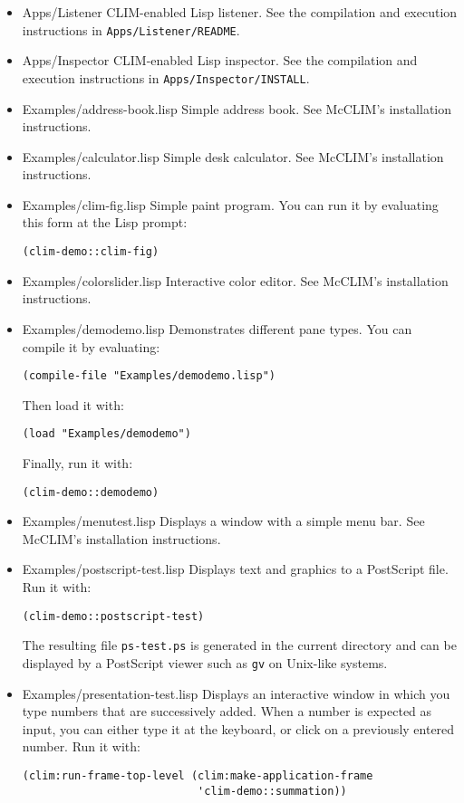 \begin{itemize}
\item Apps/Listener
CLIM-enabled Lisp listener.  See the compilation and execution
instructions in \texttt{Apps/Listener/README}.
\item Apps/Inspector
CLIM-enabled Lisp inspector.  See the compilation and execution
instructions in \texttt{Apps/Inspector/INSTALL}.
\item Examples/address-book.lisp
Simple address book.  See McCLIM's installation instructions.
\item Examples/calculator.lisp
Simple desk calculator.  See McCLIM's installation instructions.
\item Examples/clim-fig.lisp
Simple paint program.  You can run it by evaluating this form at the
Lisp prompt:
\begin{verbatim}
(clim-demo::clim-fig)
\end{verbatim}
\item Examples/colorslider.lisp
Interactive color editor.  See McCLIM's installation instructions.
\item Examples/demodemo.lisp
Demonstrates different pane types.  You can compile it by evaluating:
\begin{verbatim}
(compile-file "Examples/demodemo.lisp")
\end{verbatim}
Then load it with:
\begin{verbatim}
(load "Examples/demodemo")
\end{verbatim}
Finally, run it with:
\begin{verbatim}
(clim-demo::demodemo)
\end{verbatim}
\item Examples/menutest.lisp
Displays a window with a simple menu bar.  See McCLIM's installation
instructions.
\item Examples/postscript-test.lisp
Displays text and graphics to a PostScript file.  Run it with:
\begin{verbatim}
(clim-demo::postscript-test)
\end{verbatim}
The resulting file \texttt{ps-test.ps} is generated in the current directory
and can be displayed by a PostScript viewer such as \texttt{gv} on Unix-like
systems.
\item Examples/presentation-test.lisp
Displays an interactive window in which you type numbers that are
successively added.  When a number is expected as input, you can either
type it at the keyboard, or click on a previously entered number. Run it
with:
\begin{verbatim}
(clim:run-frame-top-level (clim:make-application-frame
                           'clim-demo::summation))
\end{verbatim}


\end{itemize}
